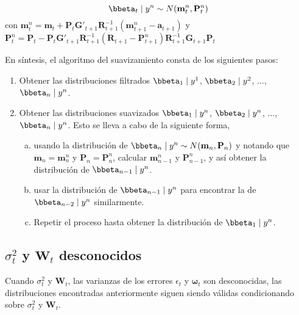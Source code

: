 \begin{Res}
\begin{equation}
\bbeta_t \mid y^n\sim N(\mathbf{m}^n_t,\mathbf{P}^n_t)
\end{equation}
con $\mathbf{m}^n_t=\mathbf{m}_t+\mathbf{P}_t\mathbf{G}'_{t+1}\mathbf{R}_{t+1}^{-1}(\mathbf{m}^n_{t+1}-\mathbf{a}_{t+1})$ y $\mathbf{P}^n_t=\mathbf{P}_t-\mathbf{P}_t\mathbf{G}'_{t+1}\mathbf{R}^{-1}_{t+1}(\mathbf{R}_{t+1}-\mathbf{P}^n_{t+1})\mathbf{R}^{-1}_{t+1}\mathbf{G}_{t+1}\mathbf{P}_t$
\end{Res}
En síntesis, el algoritmo del suavizamiento consta de los siguientes pasos:
\begin{enumerate}
\item Obtener las distribuciones filtrados $\bbeta_1 \mid y^1$, $\bbeta_2 \mid y ^2$, $\ldots$, $\bbeta_n \mid y^n$.
\item Obtener las distribuciones suavizados $\bbeta_1 \mid y^n$, $\bbeta_2 \mid y^n$, $\ldots$, $\bbeta_n \mid y^n$. Esto se lleva a cabo de la siguiente forma,
    \begin{enumerate}[(a)]
    \item usando la distribución de $\bbeta_n \mid y^n\sim N(\mathbf{m}_n,\mathbf{P}_n)$ y notando que $\mathbf{m}_n=\mathbf{m}_n^n$ y $\mathbf{P}_n=\mathbf{P}_n^n$, calcular $\mathbf{m}_{n-1}^n$ y $\mathbf{P}_{n-1}^n$, y así obtener la distribución de $\bbeta_{n-1} \mid y^n$.
    \item usar la distribución de $\bbeta_{n-1} \mid y^n$ para encontrar la de $\bbeta_{n-2} \mid y^n$ similarmente.
    \item Repetir el proceso hasta obtener la distribución de $\bbeta_1 \mid y^n$.
    \end{enumerate}
\end{enumerate}

\subsection{$\sigma^2_t$ y $\mathbf{W}_t$ desconocidos}
Cuando $\sigma^2_t$ y $\mathbf{W}_t$, las varianzas de los errores $\epsilon_t$ y $\boldsymbol{\omega}_t$ son desconocidas, las distribuciones encontradas anteriormente siguen siendo válidas condicionando sobre $\sigma^2_t$ y $\mathbf{W}_t$.

